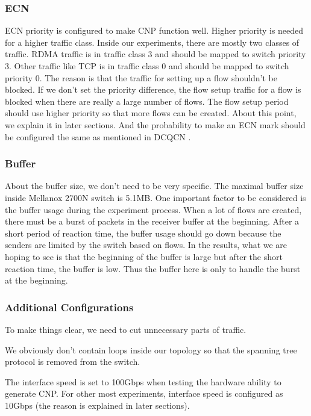 \documentclass[12pt,a4paper]{article}
\begin{document}
\subsubsection{ECN}
ECN priority is configured to make CNP function well. Higher priority is needed for a higher traffic class.
Inside our experiments, there are mostly two classes of traffic. RDMA traffic is in traffic class 3 and should be mapped to switch priority 3.
Other traffic like TCP is in traffic class 0 and should be mapped to switch priority 0.
The reason is that the traffic for setting up a flow shouldn't be blocked. If we don't set the priority difference, the flow setup traffic for a flow
is blocked when there are really a large number of flows. The flow setup period should use higher priority so that more flows can be created.
About this point, we explain it in later sections.
And the probability to make an ECN mark should be configured the same as mentioned in DCQCN \cite{dcqcn}.

\subsubsection{Buffer}
About the buffer size, we don't need to be very specific. The maximal buffer size inside Mellanox 2700N switch is 5.1MB.
One important factor to be considered is the buffer usage during the experiment process.
When a lot of flows are created, there must be a burst of packets in the receiver buffer at the beginning.
After a short period of reaction time, the buffer usage should go down because the senders are limited by the switch based on flows.
In the results, what we are hoping to see is that the beginning of the buffer is large but after the short reaction time, the buffer is low.
Thus the buffer here is only to handle the burst at the beginning.

\subsubsection{Additional Configurations}
To make things clear, we need to cut unnecessary parts of traffic.

We obviously don't contain loops inside our topology so that the spanning tree protocol is removed from the switch.

The interface speed is set to 100Gbps when testing the hardware ability to generate CNP.
For other most experiments, interface speed is configured as 10Gbps (the reason is explained in later sections).
\end{document}
